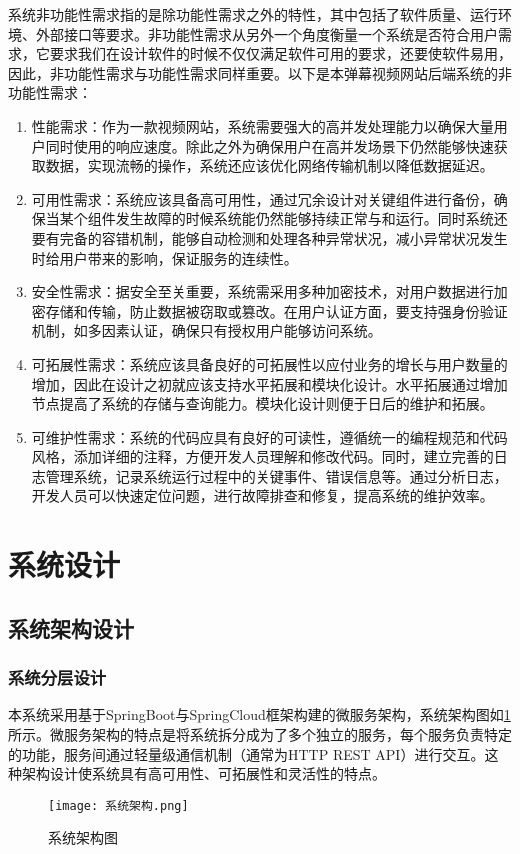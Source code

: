 系统非功能性需求指的是除功能性需求之外的特性，其中包括了软件质量、运行环境、外部接口等要求。非功能性需求从另外一个角度衡量一个系统是否符合用户需求，它要求我们在设计软件的时候不仅仅满足软件可用的要求，还要使软件易用，因此，非功能性需求与功能性需求同样重要\cite{RN08}。以下是本弹幕视频网站后端系统的非功能性需求：
\begin{enumerate}[label=(\arabic*)]
    \item 性能需求：作为一款视频网站，系统需要强大的高并发处理能力以确保大量用户同时使用的响应速度。除此之外为确保用户在高并发场景下仍然能够快速获取数据，实现流畅的操作，系统还应该优化网络传输机制以降低数据延迟。
    \item 可用性需求：系统应该具备高可用性，通过冗余设计对关键组件进行备份，确保当某个组件发生故障的时候系统能仍然能够持续正常与和运行。同时系统还要有完备的容错机制，能够自动检测和处理各种异常状况，减小异常状况发生时给用户带来的影响，保证服务的连续性。
    \item 安全性需求：据安全至关重要，系统需采用多种加密技术，对用户数据进行加密存储和传输，防止数据被窃取或篡改。在用户认证方面，要支持强身份验证机制，如多因素认证，确保只有授权用户能够访问系统。
    \item 可拓展性需求：系统应该具备良好的可拓展性以应付业务的增长与用户数量的增加，因此在设计之初就应该支持水平拓展和模块化设计。水平拓展通过增加节点提高了系统的存储与查询能力。模块化设计则便于日后的维护和拓展。
    \item 可维护性需求：系统的代码应具有良好的可读性，遵循统一的编程规范和代码风格，添加详细的注释，方便开发人员理解和修改代码。同时，建立完善的日志管理系统，记录系统运行过程中的关键事件、错误信息等。通过分析日志，开发人员可以快速定位问题，进行故障排查和修复，提高系统的维护效率。
\end{enumerate}

\newpage

\section{系统设计}

\subsection{系统架构设计}

\subsubsection{系统分层设计}

本系统采用基于SpringBoot与SpringCloud框架构建的微服务架构，系统架构图如\ref{系统架构图}所示。微服务架构的特点是将系统拆分成为了多个独立的服务，每个服务负责特定的功能，服务间通过轻量级通信机制（通常为HTTP REST API）进行交互\cite{EN03}。这种架构设计使系统具有高可用性、可拓展性和灵活性的特点。
\begin{figure}[hbt]
    \centering
    \texttt{[image: 系统架构.png]}
    \caption{系统架构图}
    \label{系统架构图}
\end{figure}

